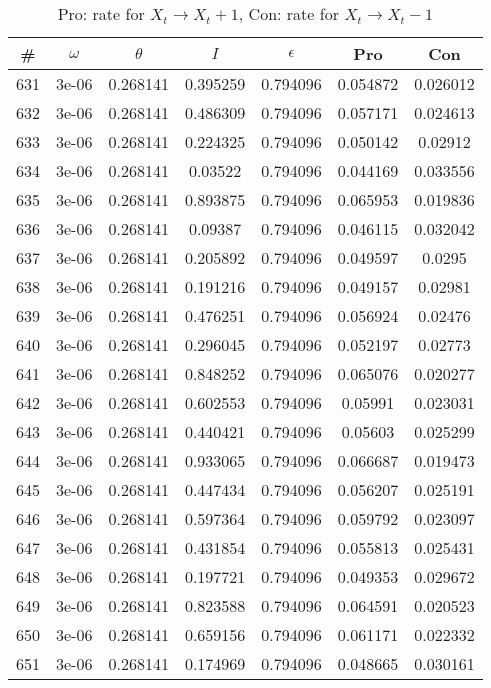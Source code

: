 \newpage
\begin{table}
\caption{Pro: rate for $X_t \rightarrow X_t + 1$, Con: rate for $X_t \rightarrow X_t - 1$}
\begin{tabular*}{\linewidth}{c|c|c|c|c|c|c}
\# & $\omega$ & $\theta$ & $I$ & $\epsilon$ & Pro & Con \\
\hline
631 & 3e-06 & 0.268141 & 0.395259 & 0.794096 & 0.054872 & 0.026012\\
632 & 3e-06 & 0.268141 & 0.486309 & 0.794096 & 0.057171 & 0.024613\\
633 & 3e-06 & 0.268141 & 0.224325 & 0.794096 & 0.050142 & 0.02912\\
634 & 3e-06 & 0.268141 & 0.03522 & 0.794096 & 0.044169 & 0.033556\\
635 & 3e-06 & 0.268141 & 0.893875 & 0.794096 & 0.065953 & 0.019836\\
636 & 3e-06 & 0.268141 & 0.09387 & 0.794096 & 0.046115 & 0.032042\\
637 & 3e-06 & 0.268141 & 0.205892 & 0.794096 & 0.049597 & 0.0295\\
638 & 3e-06 & 0.268141 & 0.191216 & 0.794096 & 0.049157 & 0.02981\\
639 & 3e-06 & 0.268141 & 0.476251 & 0.794096 & 0.056924 & 0.02476\\
640 & 3e-06 & 0.268141 & 0.296045 & 0.794096 & 0.052197 & 0.02773\\
641 & 3e-06 & 0.268141 & 0.848252 & 0.794096 & 0.065076 & 0.020277\\
642 & 3e-06 & 0.268141 & 0.602553 & 0.794096 & 0.05991 & 0.023031\\
643 & 3e-06 & 0.268141 & 0.440421 & 0.794096 & 0.05603 & 0.025299\\
644 & 3e-06 & 0.268141 & 0.933065 & 0.794096 & 0.066687 & 0.019473\\
645 & 3e-06 & 0.268141 & 0.447434 & 0.794096 & 0.056207 & 0.025191\\
646 & 3e-06 & 0.268141 & 0.597364 & 0.794096 & 0.059792 & 0.023097\\
647 & 3e-06 & 0.268141 & 0.431854 & 0.794096 & 0.055813 & 0.025431\\
648 & 3e-06 & 0.268141 & 0.197721 & 0.794096 & 0.049353 & 0.029672\\
649 & 3e-06 & 0.268141 & 0.823588 & 0.794096 & 0.064591 & 0.020523\\
650 & 3e-06 & 0.268141 & 0.659156 & 0.794096 & 0.061171 & 0.022332\\
651 & 3e-06 & 0.268141 & 0.174969 & 0.794096 & 0.048665 & 0.030161\\

\end{tabular*}
\end{table}

